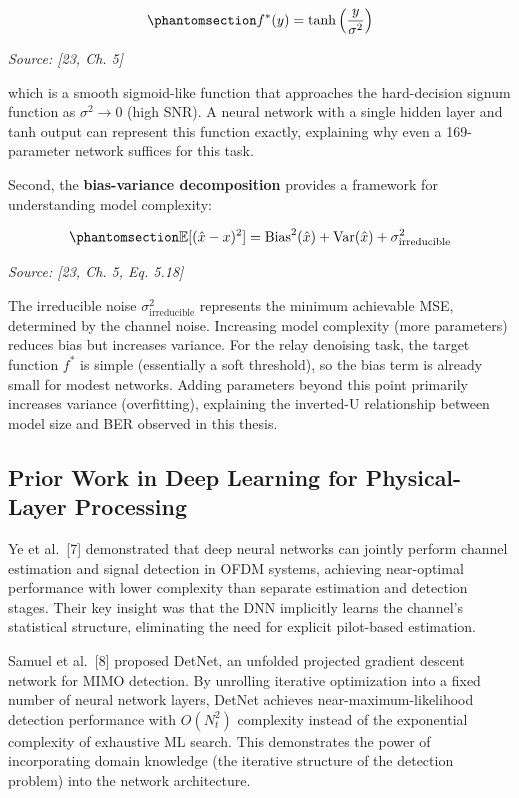 \begin{equation}\protect\phantomsection\label{eq:optimal-denoiser-awgn}{f^*(y) = \tanh\left(\frac{y}{\sigma^2}\right)
}\end{equation} \par{\small\textit{Source: [23, Ch. 5]}}

which is a smooth sigmoid-like function that approaches the hard-decision signum function as \(\sigma^2 \to 0\) (high SNR). A neural network with a single hidden layer and tanh output can represent this function exactly, explaining why even a 169-parameter network suffices for this task.

Second, the \textbf{bias-variance decomposition} provides a framework for understanding model complexity:

\begin{equation}\protect\phantomsection\label{eq:bias-variance-decomp}{\mathbb{E}[(\hat{x} - x)^2] = \text{Bias}^2(\hat{x}) + \text{Var}(\hat{x}) + \sigma^2_{\text{irreducible}}
}\end{equation} \par{\small\textit{Source: [23, Ch. 5, Eq. 5.18]}}

The irreducible noise \(\sigma^2_{\text{irreducible}}\) represents the minimum achievable MSE, determined by the channel noise. Increasing model complexity (more parameters) reduces bias but increases variance. For the relay denoising task, the target function \(f^*\) is simple (essentially a soft threshold), so the bias term is already small for modest networks. Adding parameters beyond this point primarily increases variance (overfitting), explaining the inverted-U relationship between model size and BER observed in this thesis.

\subsection{Prior Work in Deep Learning for Physical-Layer Processing}\label{sec:prior-work-in-deep-learning-for-physical-layer-processing}

Ye et al.~{[}7{]} demonstrated that deep neural networks can jointly perform channel estimation and signal detection in OFDM systems, achieving near-optimal performance with lower complexity than separate estimation and detection stages. Their key insight was that the DNN implicitly learns the channel's statistical structure, eliminating the need for explicit pilot-based estimation.

Samuel et al.~{[}8{]} proposed DetNet, an unfolded projected gradient descent network for MIMO detection. By unrolling iterative optimization into a fixed number of neural network layers, DetNet achieves near-maximum-likelihood detection performance with \(O(N_t^2)\) complexity instead of the exponential complexity of exhaustive ML search. This demonstrates the power of incorporating domain knowledge (the iterative structure of the detection problem) into the network architecture.

